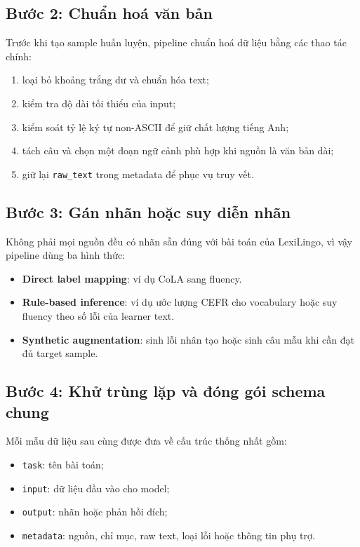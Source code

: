 \documentclass[12pt,a4paper]{article}
\begin{document}
\subsection{Bước 2: Chuẩn hoá văn bản}

Trước khi tạo sample huấn luyện, pipeline chuẩn hoá dữ liệu bằng các thao tác chính:

\begin{enumerate}[leftmargin=1.2cm]
    \item loại bỏ khoảng trắng dư và chuẩn hóa text;
    \item kiểm tra độ dài tối thiểu của input;
    \item kiểm soát tỷ lệ ký tự non-ASCII để giữ chất lượng tiếng Anh;
    \item tách câu và chọn một đoạn ngữ cảnh phù hợp khi nguồn là văn bản dài;
    \item giữ lại \texttt{raw\_text} trong metadata để phục vụ truy vết.
\end{enumerate}

\subsection{Bước 3: Gán nhãn hoặc suy diễn nhãn}

Không phải mọi nguồn đều có nhãn sẵn đúng với bài toán của LexiLingo, vì vậy pipeline dùng ba hình thức:

\begin{itemize}[leftmargin=1.2cm]
    \item \textbf{Direct label mapping}: ví dụ CoLA sang fluency.
    \item \textbf{Rule-based inference}: ví dụ ước lượng CEFR cho vocabulary hoặc suy fluency theo số lỗi của learner text.
    \item \textbf{Synthetic augmentation}: sinh lỗi nhân tạo hoặc sinh câu mẫu khi cần đạt đủ target sample.
\end{itemize}

\subsection{Bước 4: Khử trùng lặp và đóng gói schema chung}

Mỗi mẫu dữ liệu sau cùng được đưa về cấu trúc thống nhất gồm:

\begin{itemize}[leftmargin=1.2cm]
    \item \texttt{task}: tên bài toán;
    \item \texttt{input}: dữ liệu đầu vào cho model;
    \item \texttt{output}: nhãn hoặc phản hồi đích;
    \item \texttt{metadata}: nguồn, chỉ mục, raw text, loại lỗi hoặc thông tin phụ trợ.
\end{itemize}
\end{document}
